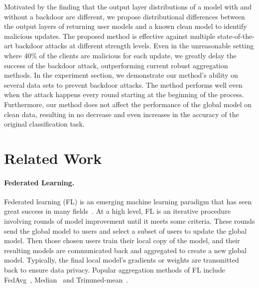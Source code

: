 \documentclass{article} %
\newcommand{\yli}[1]{{\color{cyan}#1}}
\newcommand{\mh}[1]{{\color{red}#1}}
\begin{document}
Motivated by the finding that the output layer distributions of a model with and without a backdoor are different, we propose distributional differences between the output layers of returning user models and a known clean model to identify malicious updates. The proposed method is effective against multiple state-of-the-art backdoor attacks at different strength levels. Even in the unreasonable setting where 40\% of the clients are malicious for each update, we greatly delay the success of the backdoor attack, outperforming current robust aggregation methods. 
In the experiment section, we demonstrate our method's ability on several data sets to prevent backdoor attacks. 
\yli{The method performs well even when the attack happens every round starting at the beginning of the process.}
\yli{Furthermore, our method does not affect the performance of the global model on clean data, resulting in no decrease and even increases in the accuracy of the original classification task.}


\vspace{-10pt}
\section{Related Work}
\vspace{-5pt}

\paragraph{Federated Learning.} Federated learning (FL) is an emerging machine learning paradigm that has seen great success in many fields~\citep{ryffel2018generic,hard2018federated,bonawitz2019towards}.
At a high level, FL is an iterative procedure involving rounds of model improvement until it meets some criteria. These rounds send the global model to users and select a subset of users to update the global model. Then those chosen users train their local copy of the model, and their resulting models are communicated back and aggregated to create a new global model. Typically, the final local model's gradients or weights are transmitted back to ensure data privacy. \yli{Popular aggregation methods of FL include FedAvg~\citep{fedavg}, Median~\citep{yin2018byzantine} and Trimmed-mean~\citep{yin2018byzantine}.}
\end{document}
